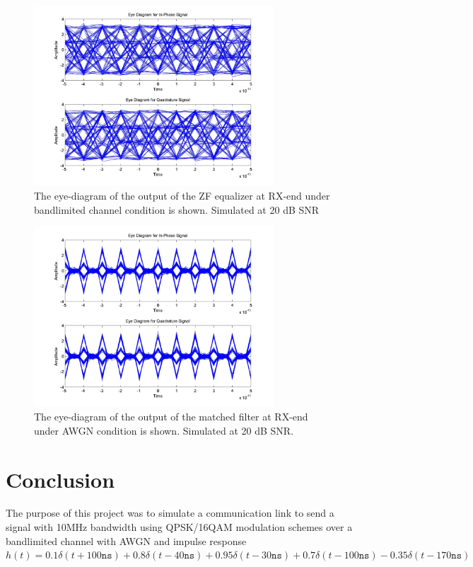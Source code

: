 \documentclass[]{article}
\begin{document}
\begin{figure}[H]
\centering
\includegraphics[width=0.8\textwidth]{equalized_eye_qam20.jpg}
\caption{The eye-diagram of the output of the ZF equalizer at RX-end under bandlimited channel condition is shown. Simulated at 20 dB SNR \label{fig:qamEyeEqu}}
\end{figure}

\begin{figure}[H]
\centering
\includegraphics[width=0.8\textwidth]{awgn_eye_qam20.jpg}
\caption{ The eye-diagram of the output of the matched filter at RX-end under AWGN condition is shown. Simulated at 20 dB SNR.\label{fig:qamEyeAWGN}}
\end{figure}

\newpage
\section{Conclusion}
\label{sec:conc}

The purpose of this project was to simulate a communication link to send a signal with 10MHz bandwidth using QPSK/16QAM modulation schemes over a bandlimited channel with AWGN and impulse response  $h(t) = 0.1\delta(t + 100 \mathtt{ns}) + 0.8\delta(t -40 \mathtt{ns}) + 0.95\delta(t - 30 \mathtt{ns}) + 0.7\delta(t - 100 \mathtt{ns}) - 0.35\delta(t - 170 \mathtt{ns}) $
\end{document}
